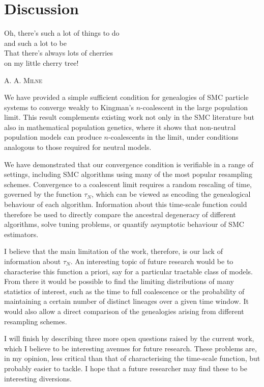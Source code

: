 \chapter{Discussion}

\epigraph{
Oh, there's such a lot of things to do\\
\hspace{5pt} and such a lot to be\\
That there's always lots of cherries\\
\hspace{7pt} on my little cherry tree!
}
{\textsc{A. A. Milne}}

We have provided a simple sufficient condition for genealogies of SMC particle systems to converge weakly to Kingman's $n$-coalescent in the large population limit. 
This result complements existing work not only in the SMC literature but also in mathematical population genetics, where it shows that non-neutral population models can produce $n$-coalescents in the limit, under conditions analogous to those required for neutral models.

We have demonstrated that our convergence condition is verifiable in a range of settings, including SMC algorithms using many of the most popular resampling schemes. 
Convergence to a coalescent limit requires a random rescaling of time, governed by the function $\tau_N$, which can be viewed as encoding the genealogical behaviour of each algorithm.
Information about this time-scale function could therefore be used to directly compare the ancestral degeneracy of different algorithms, solve tuning problems, or quantify asymptotic behaviour of SMC estimators.

I believe that the main limitation of the work, therefore, is our lack of information about $\tau_N$. An interesting topic of future research would be to characterise this function a priori, say for a particular tractable class of models.
From there it would be possible to find the limiting distributions of many statistics of interest, such as the time to full coalescence or the probability of maintaining a certain number of distinct lineages over a given time window. It would also allow a direct comparison of the genealogies arising from different resampling schemes.

I will finish by describing three more open questions raised by the current work, which I believe to be interesting avenues for future research. These problems are, in my opinion, less critical than that of characterising the time-scale function, but probably easier to tackle. 
I hope that a future researcher may find these to be interesting diversions.

